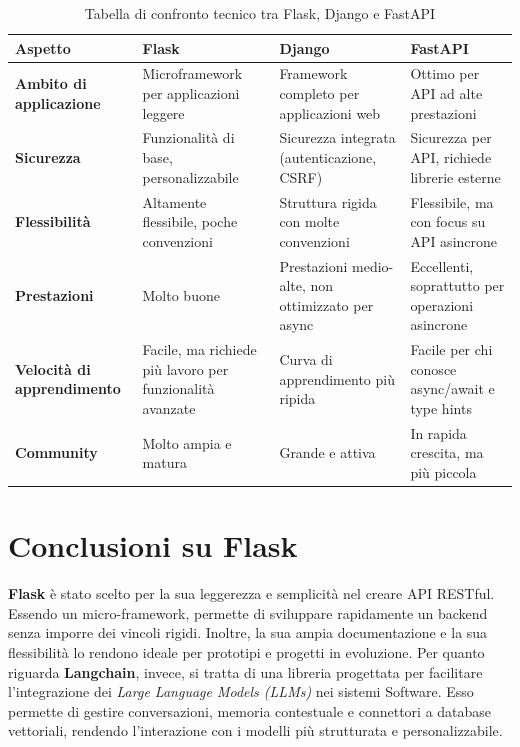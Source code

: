 \documentclass{article}
\begin{document}
\begin{table}[H]
    \renewcommand{\arraystretch}{1.7}
    \centering
    \begin{tabular}{|p{2.55cm}|p{4cm}|p{4cm}|p{4cm}|}
        \hline
        \textbf{Aspetto} & \textbf{\large Flask} & \textbf{\large Django} & \textbf{\large FastAPI} \\
        \hline
        \textbf{Ambito di applicazione} & Microframework per applicazioni leggere & Framework completo per applicazioni web & Ottimo per API ad alte prestazioni \\
        \hline
        \textbf{Sicurezza} & Funzionalità di base, personalizzabile & Sicurezza integrata (autenticazione, CSRF) & Sicurezza per API, richiede librerie esterne \\
        \hline
        \textbf{Flessibilità} & Altamente flessibile, poche convenzioni & Struttura rigida con molte convenzioni & Flessibile, ma con focus su API asincrone \\
        \hline
        \textbf{Prestazioni} & Molto buone & Prestazioni medio-alte, non ottimizzato per async & Eccellenti, soprattutto per operazioni asincrone \\
        \hline
        \textbf{Velocità di apprendimento} & Facile, ma richiede più lavoro per funzionalità avanzate & Curva di apprendimento più ripida & Facile per chi conosce async/await e type hints \\
        \hline
        \textbf{Community} & Molto ampia e matura & Grande e attiva & In rapida crescita, ma più piccola \\
        \hline
    \end{tabular}
    \caption{Tabella di confronto tecnico tra Flask, Django e FastAPI}
\end{table}

\section{Conclusioni su Flask}
\textbf{Flask} è stato scelto per la sua leggerezza e semplicità nel creare 
API RESTful. Essendo un micro-framework, permette di sviluppare 
rapidamente un backend senza imporre dei vincoli rigidi. 
Inoltre, la sua ampia documentazione e la sua flessibilità lo rendono 
ideale per prototipi e progetti in evoluzione.
Per quanto riguarda \textbf{Langchain}, invece, si tratta di una libreria
progettata per facilitare l'integrazione dei \textit{Large Language Models (LLMs)}
nei sistemi Software. Esso permette di gestire conversazioni, memoria
contestuale e connettori a database vettoriali, rendendo l'interazione 
con i modelli più strutturata e personalizzabile.
\end{document}
